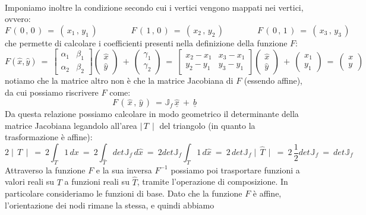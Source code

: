 \documentclass[12pt,a4paper]{report}
\theoremstyle{theorem}
\theoremstyle{theorem}
\theoremstyle{definition}
\begin{document}
\hfill \\
Imponiamo inoltre la condizione secondo cui i vertici vengono mappati nei vertici, ovvero:
\[ F \, ( \, 0 \, , \, 0 \, ) \ = \ ( \, x_{1} \, , \, y_{1} \, ) \qquad \qquad F \, ( \, 1 \, , \, 0 \, ) \ = \ ( \, x_{2} \, , \, y_{2} \, ) \qquad \qquad F \, ( \, 0 \, , \, 1 \, ) \ = \ ( \, x_{3} \, , \, y_{3} \, ) \]
che permette di calcolare i coefficienti presenti nella definizione della funzione $F$:
\[
F(\hat{x}, \hat{y} ) \ = \ \left[ \begin{array}{ccc}
\alpha_{1} & \beta_{1} \\
\alpha_{2} & \beta_{2} \end{array} \right] \left( \begin{array}{ccc}
\hat{x} \\
\hat{y} \end{array} \right) \ + \ \left( \begin{array}{ccc}
\gamma_{1} \\
\gamma_{2} \end{array} \right) \ = \ \left[ \begin{array}{ccc}
x_{2} - x_{1} & x_{3} - x_{1} \\
y_{2} - y_{1} & y_{3} - y_{1} \end{array} \right] \left( \begin{array}{ccc}
\hat{x} \\
\hat{y} \end{array} \right) \ + \ \left( \begin{array}{ccc}
x_{1} \\
y_{1} \end{array} \right) \ = \ \left( \begin{array}{ccc}
x \\
y \end{array} \right) 
\]
notiamo che la matrice altro non è che la matrice Jacobiana di $F$ (essendo affine), da cui possiamo riscrivere $F$ come:
\[ F \, ( \, \hat{x} \, , \, \hat{y} \, ) \ = \mathbb{J}_{f} \, \underline{\hat{x}} \ + \ \underline{b} \]
Da questa relazione possiamo calcolare in modo geometrico il determinante della matrice Jacobiana legandolo all'area $\mid \, T \, \mid$ del triangolo (in quanto la trasformazione è affine):
\[ 2 \mid \, T \, \mid \ = \ 2 \int_{T}{1 \, dx} \ = \ 2 \int_{\hat{T}}{det \mathbb{J}_{f} \, d\hat{x}} \ = \ 2 det \mathbb{J}_{f} \int_{\hat{T}}{1 \, d\hat{x}} \ = \ 2 \, det \mathbb{J}_{f} \mid \, \hat{T} \, \mid \ = \ 2 \,  \frac{1}{2} det \mathbb{J}_{f} \ = \ det \mathbb{J}_{f} \]
Attraverso la funzione $F$ e la sua inversa $F^{-1}$ possiamo poi trasportare funzioni a valori reali su $T$ a funzioni reali su $\hat{T}$, tramite l'operazione di composizione. In particolare consideriamo le funzioni di base. Dato che la funzione $F$ è affine, l'orientazione dei nodi rimane la stessa, e quindi abbiamo
\end{document}
